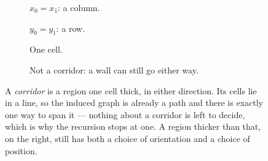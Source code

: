 \begin{figure}[htbp]
  \centering
  \begin{subfigure}[b]{0.20\textwidth}\centering
    \caption{$x_0=x_1$: a column.}
    \label{fig:corridor-column}
  \end{subfigure}\hfill
  \begin{subfigure}[b]{0.24\textwidth}\centering
    \caption{$y_0=y_1$: a row.}
    \label{fig:corridor-row}
  \end{subfigure}\hfill
  \begin{subfigure}[b]{0.16\textwidth}\centering
    \caption{One cell.}
    \label{fig:corridor-cell}
  \end{subfigure}\hfill
  \begin{subfigure}[b]{0.30\textwidth}\centering
    \caption{Not a corridor: a wall can still go either way.}
    \label{fig:corridor-not}
  \end{subfigure}
  \caption{A \emph{corridor} is a region one cell thick, in either direction.
  Its cells lie in a line, so the induced graph is already a path and there is
  exactly one way to span it --- nothing about a corridor is left to decide,
  which is why the recursion stops at one. A region thicker than that, on the
  right, still has both a choice of orientation and a choice of position.}
  \label{fig:corridor}
\end{figure}
